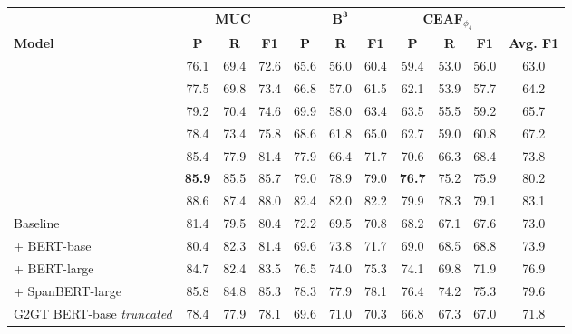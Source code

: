 \documentclass[11pt]{article}
\begin{document}
\begin{table*}[t]
	\centering
	\begin{adjustbox}{width=1\textwidth}
		\begin{tabular}{l c c c | c c c | c c c | c } 
			\toprule \
			& \multicolumn{3}{c}{\textbf{MUC}} & \multicolumn{3}{c}{$\mathbf{B^3}$} & \multicolumn{3}{c}{\textbf{CEAF$_{\phi_4}$}} \\ 
			\textbf{Model} & \textbf{P} & \textbf{R} & \textbf{F1} & \textbf{P} & \textbf{R} & \textbf{F1} & \textbf{P} & \textbf{R} & \textbf{F1} &\textbf{Avg. F1} \\ \hline
			\citet{clark-manning-2015-entity} & 76.1 & 69.4 & 72.6 & 65.6 & 56.0 & 60.4 & 59.4 & 53.0 & 56.0 & 63.0 \\ 
			\citet{wiseman-etal-2016-learning} & 77.5 & 69.8 & 73.4 & 66.8 & 57.0 & 61.5 & 62.1 & 53.9 & 57.7 & 64.2 \\
			\citet{clark-manning-2016-improving} & 79.2 & 70.4 & 74.6 & 69.9 & 58.0 & 63.4 & 63.5 & 55.5 & 59.2 & 65.7 \\
			\citet{lee-etal-2017-end} & 78.4 & 73.4 & 75.8 & 68.6 & 61.8 & 65.0 & 62.7 & 59.0 & 60.8 &  67.2  \\ 
			\citet{fei-etal-2019-end} & 85.4 & 77.9 & 81.4 & 77.9 & 66.4 & 71.7 & 70.6 & 66.3 & 68.4  & 73.8 \\ 
			\citet{xu-choi-2020-revealing} & \textbf{85.9} & 85.5 &85.7 &79.0 &78.9 &79.0 &\textbf{76.7}& 75.2& 75.9& 80.2 \\
			\citet{wu-etal-2020-corefqa} & {\color{gray}88.6} & {\color{gray}87.4} & {\color{gray}88.0} & {\color{gray}82.4}& {\color{gray}82.0} & {\color{gray}82.2} & {\color{gray}79.9} & {\color{gray}78.3} & {\color{gray}79.1}& {\color{gray}83.1} \\
			\hline
			Baseline \cite{lee-etal-2018-higher}   & 81.4 & 79.5 & 80.4 & 72.2 & 69.5 & 70.8 & 68.2 & 67.1 & 67.6 & 73.0 \\
			+ BERT-base \cite{joshi-etal-2019-bert}  & 80.4 & 82.3 & 81.4 & 69.6 & 73.8 & 71.7 & 69.0 & 68.5 & 68.8 & 73.9 \\
			+ BERT-large \cite{joshi-etal-2019-bert}  & 84.7 & 82.4 & 83.5 & 76.5 & 74.0 & 75.3 & 74.1 & 69.8 & 71.9 & 76.9 \\  
			+ SpanBERT-large \cite{joshi-etal-2020-spanbert} & 85.8 & 84.8 &85.3 &78.3 &77.9 &78.1& 76.4& 74.2 &75.3 &79.6 \\ \hline
			G2GT BERT-base \emph{truncated} & 78.4 & 77.9 & 78.1 & 69.6 & 71.0 & 70.3 & 66.8 & 67.3 & 67.0 & 71.8 \\

\end{tabular}
\end{adjustbox}
\end{table*}
\end{document}
